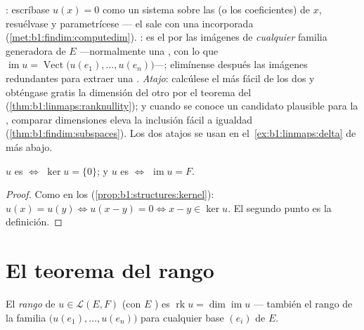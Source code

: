 \begin{method}
\label{met:b1:linmaps:kerim}
\emph{}: escríbase $u(x) = 0$ como un sistema sobre las
 (o los coeficientes) de $x$, resuélvase y
parametrícese --- el  sale con una  incorporada
(\cref{met:b1:findim:computedim}). \emph{}: es el
 por las imágenes de \emph{cualquier} familia
generadora de $E$ ---normalmente una , con lo que
$\operatorname{im} u = \operatorname{Vect}\bigl(u(e_1), \dots,
u(e_n)\bigr)$---; elimínense después las imágenes redundantes para
extraer una . \emph{Atajo}: calcúlese el más fácil de los dos y
obténgase gratis la dimensión del otro por el teorema del 
(\cref{thm:b1:linmaps:ranknullity}); y cuando se conoce un
 candidato plausible para la , comparar
dimensiones eleva la inclusión fácil a igualdad
(\cref{thm:b1:findim:subspaces}). Los dos atajos se usan en
el~\cref{ex:b1:linmaps:delta} de más abajo.
\end{method}

\begin{proposition}\label{prop:b1:linmaps:kernel}
$u$ es  $\iff$ $\ker u = \{0\}$; y $u$ es 
$\iff$ $\operatorname{im} u = F$.
\end{proposition}

\begin{proof}
Como en los  (\cref{prop:b1:structures:kernel}):
$u(x) = u(y) \iff u(x - y) = 0 \iff x - y \in \ker u$. El segundo
punto es la definición.
\end{proof}

\section{El teorema del rango}

\begin{definition}\label{def:b1:linmaps:rank}
El \emph{rango} de
$u \in \mathcal{L}(E, F)$ (con $E$ ) es
$\operatorname{rk} u = \dim \operatorname{im} u$ --- también el rango
de la familia $\bigl(u(e_1), \dots, u(e_n)\bigr)$ para cualquier
base $(e_i)$ de $E$.
\end{definition}

